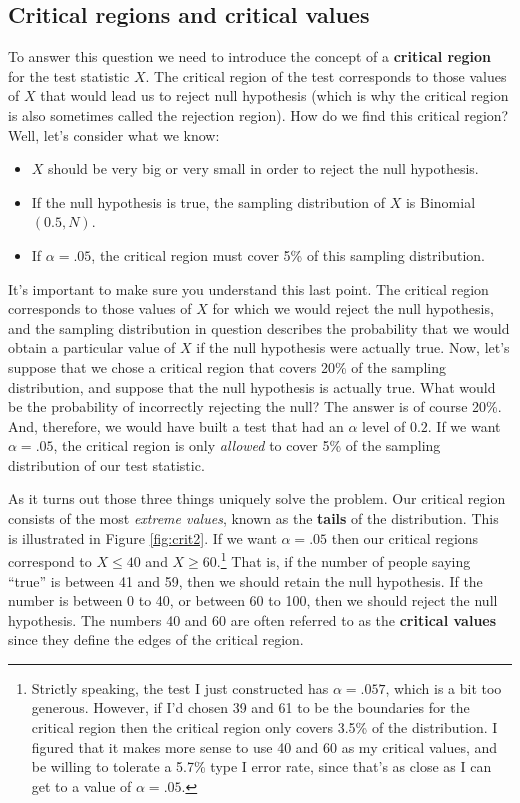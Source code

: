 \documentclass[
]{book}
\providecommand{\tightlist}{%
  \setlength{\itemsep}{0pt}\setlength{\parskip}{0pt}}
\begin{document}
\hypertarget{critical-regions-and-critical-values}{%
\subsection{Critical regions and critical values}\label{critical-regions-and-critical-values}}

To answer this question we need to introduce the concept of a {\textbf{critical region}} for the test statistic \(X\). The critical region of the test corresponds to those values of \(X\) that would lead us to reject null hypothesis (which is why the critical region is also sometimes called the rejection region). How do we find this critical region? Well, let's consider what we know:

\begin{itemize}
\tightlist
\item
  \(X\) should be very big or very small in order to reject the null hypothesis.
\item
  If the null hypothesis is true, the sampling distribution of \(X\) is Binomial\((0.5, N)\).
\item
  If \(\alpha =.05\), the critical region must cover 5\% of this sampling distribution.
\end{itemize}

It's important to make sure you understand this last point. The critical region corresponds to those values of \(X\) for which we would reject the null hypothesis, and the sampling distribution in question describes the probability that we would obtain a particular value of \(X\) if the null hypothesis were actually true. Now, let's suppose that we chose a critical region that covers 20\% of the sampling distribution, and suppose that the null hypothesis is actually true. What would be the probability of incorrectly rejecting the null? The answer is of course 20\%. And, therefore, we would have built a test that had an \(\alpha\) level of \(0.2\). If we want \(\alpha = .05\), the critical region is only \emph{allowed} to cover 5\% of the sampling distribution of our test statistic.

As it turns out those three things uniquely solve the problem. Our critical region consists of the most \emph{extreme values}, known as the {\textbf{tails}} of the distribution. This is illustrated in Figure \ref{fig:crit2}. If we want \(\alpha = .05\) then our critical regions correspond to \(X \leq 40\) and \(X \geq 60\).\footnote{Strictly speaking, the test I just constructed has \(\alpha = .057\), which is a bit too generous. However, if I'd chosen 39 and 61 to be the boundaries for the critical region then the critical region only covers 3.5\% of the distribution. I figured that it makes more sense to use 40 and 60 as my critical values, and be willing to tolerate a 5.7\% type I error rate, since that's as close as I can get to a value of \(\alpha = .05\).} That is, if the number of people saying ``true'' is between 41 and 59, then we should retain the null hypothesis. If the number is between 0 to 40, or between 60 to 100, then we should reject the null hypothesis. The numbers 40 and 60 are often referred to as the {\textbf{critical values}} since they define the edges of the critical region.
\end{document}
